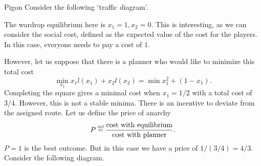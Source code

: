 \begin{aexample}{Pigon}{}
    Consider the following `traffic diagram'.
    \begin{center}
    \end{center}
\end{aexample}
The wardrop equilibrium here is $x_1=1,x_2=0$. 
This is interesting, as we can consider the social cost, defined as the expected value of the cost for the players. In this case, everyone needs to pay a cost of $1$.

However, let us suppose that there is a planner who would like to minimize this total cost \[
\min_{x_1} x_1l(x_1)+x_2l(x_2) = \min x_1^2+(1-x_1).
\]
Completing the square gives a minimal cost when $x_1=1/2$ with a total cost of $3/4$. However, this is not a stable minima. There is an incentive to deviate from the assigned route.
    Let us define the price of anarchy \[
    P \defeq \frac{\textrm{cost with equilibrium}}{\textrm{cost with planner}}.
    \]
$P=1$ is the best outcome. But in this case we have a price of $1/(3/4) = 4/3$.
Consider the following diagram.
\begin{center}
    \end{center}

